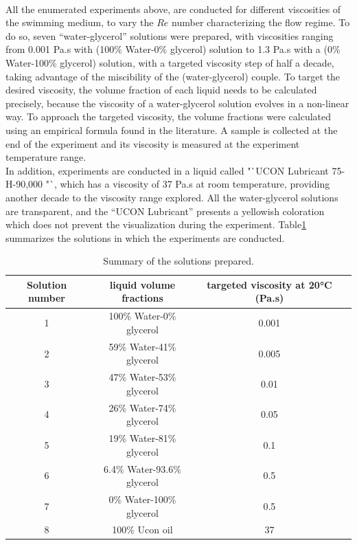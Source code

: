 \paragraph{}
All the enumerated experiments above, are conducted for different viscosities of the swimming medium, to vary the $Re$ number characterizing the flow regime. To do so, seven "`water-glycerol"' solutions were prepared, with viscosities ranging from 0.001 Pa.s with (100\% Water-0\% glycerol) solution  to 1.3 Pa.s with a (0\% Water-100\% glycerol) solution, with a targeted viscosity step of half a decade, taking advantage of the miscibility of the (water-glycerol) couple. To target the desired viscosity, the volume fraction of each liquid needs to be calculated precisely, because the viscosity of a water-glycerol solution evolves in a non-linear way\cite{viscositynonlinearCheng}. To approach the targeted viscosity, the volume fractions were calculated using an empirical formula found in the literature\cite{viscositynonlinearCheng}. A sample is collected at the end of the experiment and its viscosity is measured at the experiment temperature range.\\
In addition, experiments are conducted in a liquid called "`UCON Lubricant 75-H-90,000 "`, which has a viscosity of 37 Pa.s at room temperature, providing another decade to the viscosity range explored. All the water-glycerol solutions are transparent, and the "`UCON Lubricant"' presents a yellowish coloration which does not prevent the visualization during the experiment. 
Table\ref{tab:viscosities} summarizes the solutions in which the experiments are conducted.
\begin{table}[H]
	\centering
		\begin{adjustbox}{width=\textwidth}
			\begin{tabular}{|c|c|c|c|}
				\hline
				Solution number & liquid volume fractions & targeted viscosity at 20°C (Pa.s)\\
				\hline
				1&100\% Water-0\% glycerol&0.001\\
				2&59\% Water-41\% glycerol&0.005\\
				3&47\% Water-53\% glycerol&0.01\\
				4&26\% Water-74\% glycerol&0.05\\
				5&19\% Water-81\% glycerol&0.1\\
				6&6.4\% Water-93.6\% glycerol&0.5\\
				7&0\% Water-100\% glycerol&0.5\\
				8&100\% Ucon oil&37\\
				\hline
			\end{tabular}
		\end{adjustbox}
	\caption{Summary of the solutions prepared.}
	\label{tab:viscosities}
\end{table}
  
